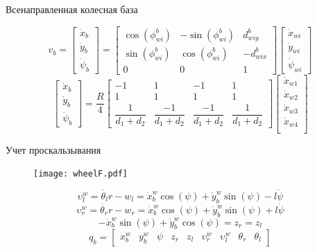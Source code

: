 \documentclass[newPxFont,numfooter,sectionpages]{beamer}
\begin{document}
\begin{frame}{Всенаправленная колесная база}
	\begin{center}

\[
v_{b} = 
\begin{bmatrix}
\dot{x}_b\\[1mm] \dot{y}_b\\[1mm] \dot{\psi}_b
\end{bmatrix} = 
\begin{bmatrix}
\cos(\phi_{wi}^b) & -\sin(\phi_{wi}^b) & d_{wiy}^b\\[1mm]
\sin(\phi_{wi}^b) & \cos(\phi_{wi}^b) & -d_{wix}^b\\[1mm]
0 & 0 & 1
\end{bmatrix}
\begin{bmatrix}
\dot{x}_{wi}\\[1mm] \dot{y}_{wi}\\[1mm] \dot{\psi}_{wi}
\end{bmatrix}
\]
\[
\begin{bmatrix}
\dot{x}_b\\[1mm] \dot{y}_b\\[1mm] \dot{\psi}_b
\end{bmatrix} = 
\frac{R}{4}
\begin{bmatrix}
-1 & 1 & -1 & 1\\[1mm]
1 & 1 & 1 & 1\\[1mm]
\dfrac{1}{d_1+d_2} & \dfrac{-1}{d_1+d_2} & \dfrac{-1}{d_1+d_2} & \dfrac{1}{d_1+d_2}
\end{bmatrix}
\begin{bmatrix}
\dot{x}_{w1}\\[1mm] \dot{x}_{w2}\\[1mm] \dot{x}_{w3}\\[1mm] \dot{x}_{w4}\\[1mm]
\end{bmatrix}
\]

	\end{center}
\end{frame}

\begin{frame}{Учет проскальзывания}
	\begin{center}
		\begin{figure}[H]
		\center
		\renewcommand{\figurename}{}
		\texttt{[image: wheelF.pdf]}
		\label{fig:scr11}
	\end{figure}
	\vspace{-6mm}
\[
\upsilon_l^w = \dot{\theta{_l}}r - w_l = \dot{x}_b^w\cos(\psi) + \dot{y}_b^w\sin(\psi) - l\dot{\psi}
\]
\[
\upsilon_r^w = \dot{\theta{_r}}r - w_r = \dot{x}_b^w\cos(\psi) + \dot{y}_b^w\sin(\psi) + l\dot{\psi}
\]
\[
-\dot{x}^w_b\sin(\psi) + \dot{y}^w_b\cos(\psi) = z_r = z_l
\]
\[
q_b = 
\begin{bmatrix}
x^w_b& y^w_b& \psi& z_r& z_l& \upsilon_r^w& \upsilon_l^w& \theta_r& \theta_l
\end{bmatrix}
\]
	\end{center}
\end{frame}
\end{document}
